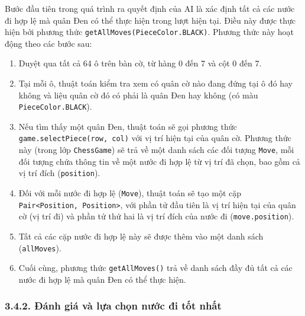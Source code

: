 \documentclass[a4paper,12pt]{article}
\begin{document}
\noindent Bước đầu tiên trong quá trình ra quyết định của AI là xác định tất cả các nước đi hợp lệ mà quân Đen có thể thực hiện trong lượt hiện tại. Điều này được thực hiện bởi phương thức \texttt{getAllMoves(PieceColor.BLACK)}. Phương thức này hoạt động theo các bước sau:
\begin{enumerate}[label=(\roman*)]
    \item Duyệt qua tất cả 64 ô trên bàn cờ, từ hàng 0 đến 7 và cột 0 đến 7.
    \item Tại mỗi ô, thuật toán kiểm tra xem có quân cờ nào đang đứng tại ô đó hay không và liệu quân cờ đó có phải là quân Đen hay không (có màu \texttt{PieceColor.BLACK}).
    \item Nếu tìm thấy một quân Đen, thuật toán sẽ gọi phương thức \texttt{game.selectPiece(row, col)} với vị trí hiện tại của quân cờ. Phương thức này (trong lớp \texttt{ChessGame}) sẽ trả về một danh sách các đối tượng \texttt{Move}, mỗi đối tượng chứa thông tin về một nước đi hợp lệ từ vị trí đã chọn, bao gồm cả vị trí đích (\texttt{position}).
    \item Đối với mỗi nước đi hợp lệ (\texttt{Move}), thuật toán sẽ tạo một cặp \texttt{Pair<Position, Position>}, với phần tử đầu tiên là vị trí hiện tại của quân cờ (vị trí đi) và phần tử thứ hai là vị trí đích của nước đi (\texttt{move.position}).
    \item Tất cả các cặp nước đi hợp lệ này sẽ được thêm vào một danh sách (\texttt{allMoves}).
    \item Cuối cùng, phương thức \texttt{getAllMoves()} trả về danh sách đầy đủ tất cả các nước đi hợp lệ mà quân Đen có thể thực hiện.
\end{enumerate}

\subsubsection*{3.4.2. Đánh giá và lựa chọn nước đi tốt nhất}
\end{document}
